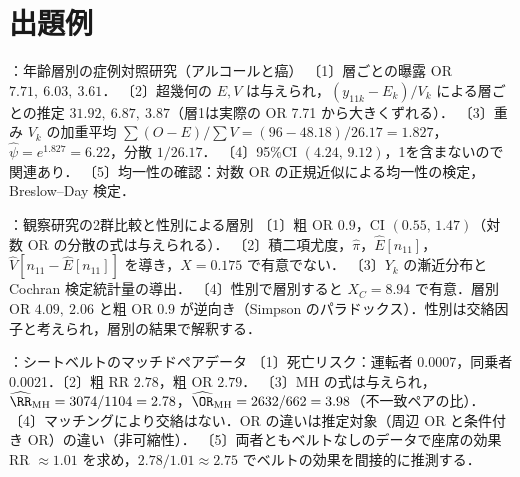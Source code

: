 \section{出題例}\label{sec:m07-shutsudai}
\begin{shutsudai}{：年齢層別の症例対照研究（アルコールと癌）}
〔1〕層ごとの曝露 OR $7.71,\ 6.03,\ 3.61$．
〔2〕超幾何の $E,V$ は与えられ，$(y_{11k}-E_k)/V_k$ による層ごとの推定 $31.92,\ 6.87,\ 3.87$（層1は実際の OR 7.71 から大きくずれる）．
〔3〕重み $V_k$ の加重平均 $\sum(O-E)/\sum V=(96-48.18)/26.17=1.827$，$\hat\psi=e^{1.827}=6.22$，分散 $1/26.17$．
〔4〕95\%CI $(4.24,\,9.12)$，1を含まないので関連あり．
〔5〕均一性の確認：対数 OR の正規近似による均一性の検定，Breslow--Day 検定．
\end{shutsudai}
\begin{shutsudai}{：観察研究の2群比較と性別による層別}
〔1〕粗 OR $0.9$，CI $(0.55,\,1.47)$（対数 OR の分散の式は与えられる）．
〔2〕積二項尤度，$\hat\pi$，$\hat E[n_{11}]$，$\hat V[n_{11}-\hat E[n_{11}]]$ を導き，$X=0.175$ で有意でない．
〔3〕$Y_k$ の漸近分布と Cochran 検定統計量の導出．
〔4〕性別で層別すると $X_C=8.94$ で有意．層別 OR $4.09,\ 2.06$ と粗 OR $0.9$ が逆向き（Simpson のパラドックス）．性別は交絡因子と考えられ，層別の結果で解釈する．
\end{shutsudai}
\begin{shutsudai}{：シートベルトのマッチドペアデータ}
〔1〕死亡リスク：運転者 0.0007，同乗者 0.0021．〔2〕粗 RR $2.78$，粗 OR $2.79$．
〔3〕MH の式は与えられ，$\widehat\RR_{\mathrm{MH}}=3074/1104=2.78$，$\widehat\OR_{\mathrm{MH}}=2632/662=3.98$（不一致ペアの比）．
〔4〕マッチングにより交絡はない．OR の違いは推定対象（周辺 OR と条件付き OR）の違い（非可縮性）．
〔5〕両者ともベルトなしのデータで座席の効果 RR $\approx1.01$ を求め，$2.78/1.01\approx2.75$ でベルトの効果を間接的に推測する．
\end{shutsudai}

